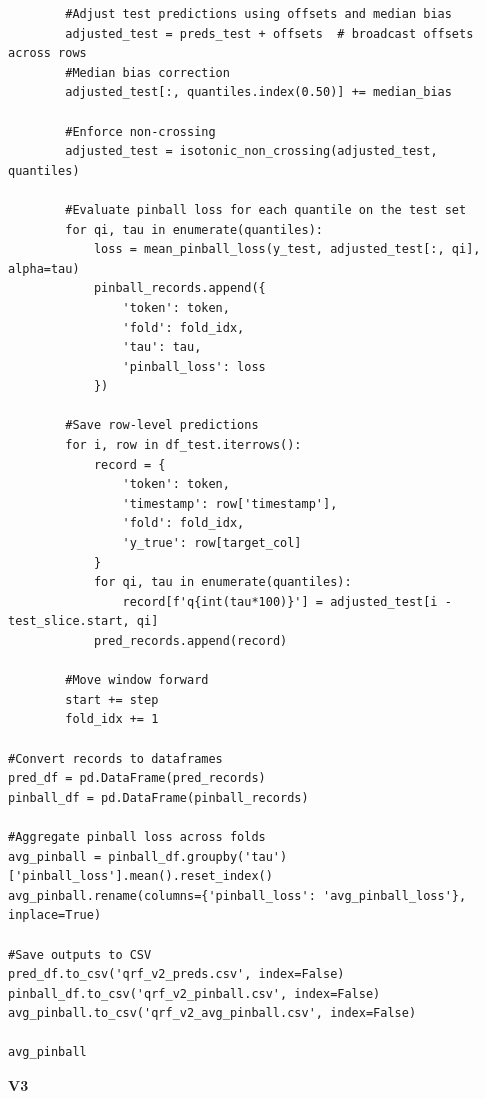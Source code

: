 \documentclass[
  a4paper,
  DIV=11,
  numbers=noendperiod]{scrreprt}
\begin{document}
\begin{verbatim}
        #Adjust test predictions using offsets and median bias
        adjusted_test = preds_test + offsets  # broadcast offsets across rows
        #Median bias correction
        adjusted_test[:, quantiles.index(0.50)] += median_bias

        #Enforce non‑crossing
        adjusted_test = isotonic_non_crossing(adjusted_test, quantiles)

        #Evaluate pinball loss for each quantile on the test set
        for qi, tau in enumerate(quantiles):
            loss = mean_pinball_loss(y_test, adjusted_test[:, qi], alpha=tau)
            pinball_records.append({
                'token': token,
                'fold': fold_idx,
                'tau': tau,
                'pinball_loss': loss
            })

        #Save row‑level predictions
        for i, row in df_test.iterrows():
            record = {
                'token': token,
                'timestamp': row['timestamp'],
                'fold': fold_idx,
                'y_true': row[target_col]
            }
            for qi, tau in enumerate(quantiles):
                record[f'q{int(tau*100)}'] = adjusted_test[i - test_slice.start, qi]
            pred_records.append(record)

        #Move window forward
        start += step
        fold_idx += 1

#Convert records to dataframes
pred_df = pd.DataFrame(pred_records)
pinball_df = pd.DataFrame(pinball_records)

#Aggregate pinball loss across folds
avg_pinball = pinball_df.groupby('tau')['pinball_loss'].mean().reset_index()
avg_pinball.rename(columns={'pinball_loss': 'avg_pinball_loss'}, inplace=True)

#Save outputs to CSV
pred_df.to_csv('qrf_v2_preds.csv', index=False)
pinball_df.to_csv('qrf_v2_pinball.csv', index=False)
avg_pinball.to_csv('qrf_v2_avg_pinball.csv', index=False)

avg_pinball
\end{verbatim}

\textbf{V3}
\end{document}
